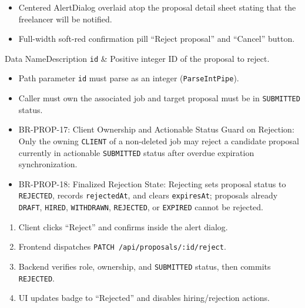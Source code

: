 \begin{itemize}[leftmargin=1.6em,topsep=3pt,itemsep=2pt,parsep=0pt,label=$\bullet$]
    \item Centered AlertDialog overlaid atop the proposal detail sheet stating that the freelancer will be notified.
    \item Full-width soft-red confirmation pill ``Reject proposal'' and ``Cancel'' button.
\end{itemize}


\begin{specdatatable}{Data Name}{Description}
\texttt{id} & Positive integer ID of the proposal to reject.\\ \hline
\end{specdatatable}

\begin{itemize}[leftmargin=1.6em,topsep=3pt,itemsep=2pt,parsep=0pt,label=$\bullet$]
    \item Path parameter \texttt{id} must parse as an integer (\texttt{ParseIntPipe}).
    \item Caller must own the associated job and target proposal must be in \texttt{SUBMITTED} status.
\end{itemize}

\begin{itemize}[leftmargin=1.6em,topsep=3pt,itemsep=2pt,parsep=0pt,label=$\bullet$]\brrulelist
    \item BR-PROP-17: Client Ownership and Actionable Status Guard on Rejection: Only the owning \texttt{CLIENT} of a non-deleted job may reject a candidate proposal currently in actionable \texttt{SUBMITTED} status after overdue expiration synchronization.
    \item BR-PROP-18: Finalized Rejection State: Rejecting sets proposal status to \texttt{REJECTED}, records \texttt{rejectedAt}, and clears \texttt{expiresAt}; proposals already \texttt{DRAFT}, \texttt{HIRED}, \texttt{WITHDRAWN}, \texttt{REJECTED}, or \texttt{EXPIRED} cannot be rejected.
\end{itemize}

\begin{enumerate}[leftmargin=1.8em,topsep=3pt,itemsep=2pt,parsep=0pt]
    \item Client clicks ``Reject'' and confirms inside the alert dialog.
    \item Frontend dispatches \texttt{PATCH /api/proposals/:id/reject}.
    \item Backend verifies role, ownership, and \texttt{SUBMITTED} status, then commits \texttt{REJECTED}.
    \item UI updates badge to ``Rejected'' and disables hiring/rejection actions.
\end{enumerate}


